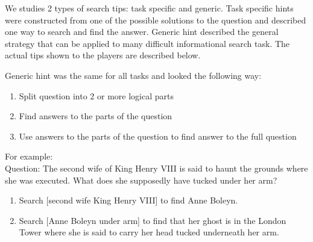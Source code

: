\documentclass{sig-alternate}
\begin{document}
We studies 2 types of search tips: task specific and generic. Task specific hints were constructed from one of the possible solutions to the question and described one way to search and find the answer. Generic hint described the general strategy that can be applied to many difficult informational search task.
The actual tips shown to the players are described below.

Generic hint was the same for all tasks and looked the following way:
\vspace{-1mm}
\begin{enumerate} \itemsep0pt \parskip0pt 
\item Split question into 2 or more logical parts
\item Find answers to the parts of the question
\item Use answers to the parts of the question to find answer to the full question
\end{enumerate}
\vspace{-1mm}
For example:\\
Question: The second wife of King Henry VIII is said to haunt the grounds where she was executed. What does she supposedly have tucked under her arm?
\vspace{-1mm}
\begin{enumerate} \itemsep0pt \parskip0pt 
\item Search [second wife King Henry VIII] to find Anne Boleyn.
\item Search [Anne Boleyn under arm] to find that her ghost is in the London Tower where she is said to carry her head tucked underneath her arm.
\end{enumerate}
\end{document}
